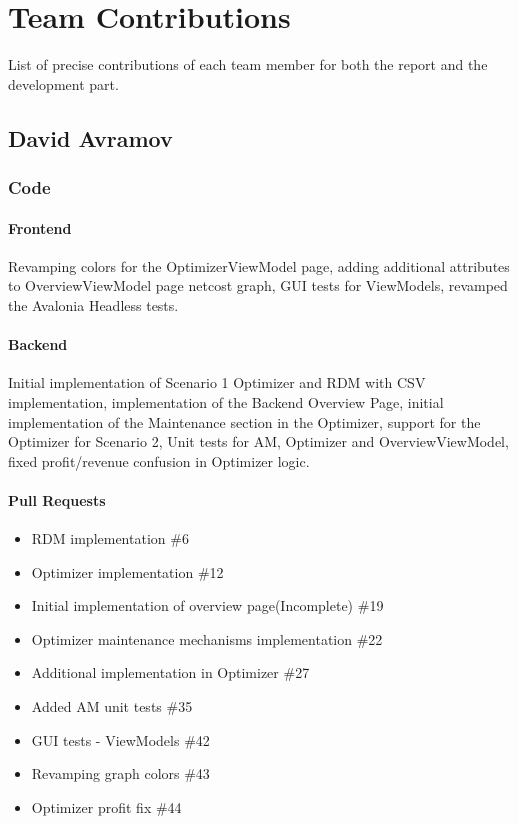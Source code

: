 
\chapter{Team Contributions}
List of precise contributions of each team member for both the report
and the development part.

\section*{David Avramov}
\subsection*{Code}
\subsubsection*{Frontend}
Revamping colors for the OptimizerViewModel page, adding additional attributes to OverviewViewModel page netcost graph, GUI tests for ViewModels, revamped the Avalonia Headless tests.
\subsubsection*{Backend}
Initial implementation of Scenario 1 Optimizer and RDM with CSV implementation, implementation of the Backend Overview Page, initial implementation of the Maintenance section in the Optimizer, support for the Optimizer for Scenario 2, Unit tests for AM, Optimizer and OverviewViewModel, fixed profit/revenue confusion in Optimizer logic.
\subsubsection*{Pull Requests}
\begin{itemize}
    \item RDM implementation \#6
    \item Optimizer implementation \#12
    \item Initial implementation of overview page(Incomplete) \#19
    \item Optimizer maintenance mechanisms implementation \#22
    \item Additional implementation in Optimizer \#27
    \item Added AM unit tests \#35
    \item GUI tests - ViewModels \#42
    \item Revamping graph colors \#43
    \item Optimizer profit fix \#44

\end{itemize}
